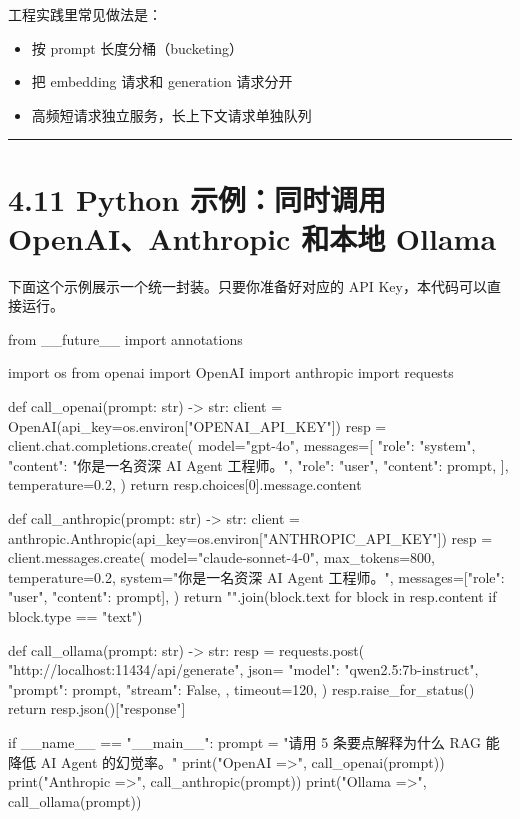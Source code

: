 工程实践里常见做法是：


\begin{itemize}[leftmargin=2em]
\item 按 prompt 长度分桶（bucketing）
\item 把 embedding 请求和 generation 请求分开
\item 高频短请求独立服务，长上下文请求单独队列
\end{itemize}

\bigskip\hrule\bigskip

\section{4.11 Python 示例：同时调用 OpenAI、Anthropic 和本地 Ollama}

下面这个示例展示一个统一封装。只要你准备好对应的 API Key，本代码可以直接运行。


\begin{codeblock}
from __future__ import annotations

import os
from openai import OpenAI
import anthropic
import requests


def call_openai(prompt: str) -> str:
    client = OpenAI(api_key=os.environ["OPENAI_API_KEY"])
    resp = client.chat.completions.create(
        model="gpt-4o",
        messages=[
            {"role": "system", "content": "你是一名资深 AI Agent 工程师。"},
            {"role": "user", "content": prompt},
        ],
        temperature=0.2,
    )
    return resp.choices[0].message.content


def call_anthropic(prompt: str) -> str:
    client = anthropic.Anthropic(api_key=os.environ["ANTHROPIC_API_KEY"])
    resp = client.messages.create(
        model="claude-sonnet-4-0",
        max_tokens=800,
        temperature=0.2,
        system="你是一名资深 AI Agent 工程师。",
        messages=[{"role": "user", "content": prompt}],
    )
    return "".join(block.text for block in resp.content if block.type == "text")


def call_ollama(prompt: str) -> str:
    resp = requests.post(
        "http://localhost:11434/api/generate",
        json={
            "model": "qwen2.5:7b-instruct",
            "prompt": prompt,
            "stream": False,
        },
        timeout=120,
    )
    resp.raise_for_status()
    return resp.json()["response"]


if __name__ == "__main__":
    prompt = "请用 5 条要点解释为什么 RAG 能降低 AI Agent 的幻觉率。"
    print("OpenAI =>", call_openai(prompt))
    print("Anthropic =>", call_anthropic(prompt))
    print("Ollama =>", call_ollama(prompt))
\end{codeblock}

